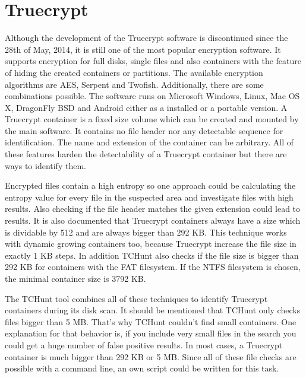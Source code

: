 \section{Truecrypt}
Although the development of the Truecrypt software is discontinued since the 28th of May, 2014, it is still one of the most popular encryption software.
It supports encryption for full disks, single files and also containers with the feature of hiding the created containers or partitions.
The available encryption algorithms are AES, Serpent and Twofish. Additionally, there are some combinations possible.
The software runs on Microsoft Windows, Linux, Mac OS X, DragonFly BSD and Android either as a installed or a portable version.\cite{wiki:truecrypt}
A Truecrypt container is a fixed size volume which can be created and mounted by the main software.
It contains no file header nor any detectable sequence for identification.
The name and extension of the container can be arbitrary.
All of these features harden the detectability of a Truecrypt container but there are ways to identify them.

Encrypted files contain a high entropy so one approach could be calculating the entropy value for every file in the suspected area and investigate files with high results.
Also checking if the file header matches the given extension could lead to results.
It is also documented that Truecrypt containers always have a size which is dividable by 512 and are always bigger than 292 KB.
This technique works with dynamic growing containers too, because Truecrypt increase the file size in exactly 1 KB steps. 
In addition TCHunt also checks if the file size is bigger than 292 KB for containers with the FAT filesystem. 
If the NTFS filesystem is chosen, the minimal container size is 3792 KB.
\cite{truecrypt:sourceCode}

The TCHunt tool combines all of these techniques to identify Truecrypt containers during its disk scan. 
It should be mentioned that TCHunt only checks files bigger than 5 MB.
That's why TCHunt couldn't find small containers. 
One explanation for that behavior is, if you include very small files in the search you could get a huge number of false positive results. 
In most cases, a Truecrypt container is much bigger than 292 KB or 5 MB. 
Since all of these file checks are possible with a command line, an own script could be written for this task.
